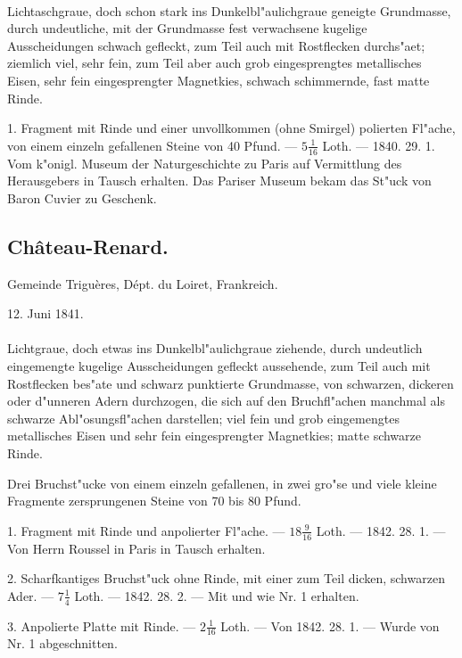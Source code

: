 \documentclass[a4paper, 11pt, oneside, polutonikogreek, german]{article}
\begin{document}
\paragraph{}
Lichtaschgraue, doch schon stark ins Dunkelbl"aulichgraue geneigte Grundmasse, durch undeutliche, mit der Grundmasse fest verwachsene kugelige Ausscheidungen schwach gefleckt, zum Teil auch mit Rostflecken durchs"aet; ziemlich viel, sehr fein, zum Teil aber auch grob eingesprengtes metallisches Eisen, sehr fein eingesprengter Magnetkies, schwach schimmernde, fast matte Rinde.

1. Fragment mit Rinde und einer unvollkommen (ohne Smirgel) polierten Fl"ache, von einem einzeln gefallenen Steine von 40 Pfund. --- $5\frac{1}{16}$ Loth. --- 1840. 29. 1. Vom k"onigl. Museum der Naturgeschichte zu Paris auf Vermittlung des Herausgebers in Tausch erhalten. Das Pariser Museum bekam das St"uck von Baron Cuvier zu Geschenk.
\subsection{Château-Renard.}
\begin{center}
\small
Gemeinde Triguères, Dépt. du Loiret, Frankreich.

12. Juni 1841.
\end{center}
\paragraph{}
Lichtgraue, doch etwas ins Dunkelbl"aulichgraue ziehende, durch undeutlich eingemengte kugelige Ausscheidungen gefleckt aussehende, zum Teil auch mit Rostflecken bes"ate und schwarz punktierte Grundmasse, von schwarzen, dickeren oder d"unneren Adern durchzogen, die sich auf den Bruchfl"achen manchmal als schwarze Abl"osungsfl"achen darstellen; viel fein und grob eingemengtes metallisches Eisen und sehr fein eingesprengter Magnetkies; matte schwarze Rinde.

Drei Bruchst"ucke von einem einzeln gefallenen, in zwei gro"se und viele kleine Fragmente zersprungenen Steine von 70 bis 80 Pfund.

1. Fragment mit Rinde und anpolierter Fl"ache. --- $18\frac{9}{16}$ Loth. --- 1842. 28. 1. --- Von Herrn Roussel in Paris in Tausch erhalten.

2. Scharfkantiges Bruchst"uck ohne Rinde, mit einer zum Teil dicken, schwarzen Ader. --- $7\frac{1}{4}$ Loth. --- 1842. 28. 2. --- Mit und wie Nr. 1 erhalten.

3. Anpolierte Platte mit Rinde. --- $2\frac{1}{16}$ Loth. --- Von 1842. 28. 1. --- Wurde von Nr. 1 abgeschnitten.
\end{document}
